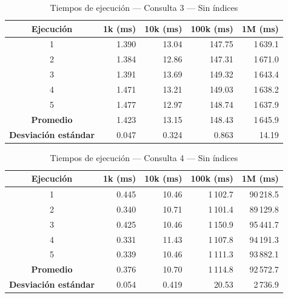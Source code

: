 \begin{table}[H]
\centering
\small
\caption{Tiempos de ejecución --- Consulta 3 --- Sin índices}
\begin{tabular}{|c|r|r|r|r|}
\hline
\textbf{Ejecución} & \textbf{1k (ms)} & \textbf{10k (ms)} & \textbf{100k (ms)} & \textbf{1M (ms)} \\ \hline
1 & 1.390 & 13.04 & 147.75 & 1\,639.1 \\ \hline
2 & 1.384 & 12.86 & 147.31 & 1\,671.0 \\ \hline
3 & 1.391 & 13.69 & 149.32 & 1\,643.4 \\ \hline
4 & 1.471 & 13.21 & 149.03 & 1\,638.2 \\ \hline
5 & 1.477 & 12.97 & 148.74 & 1\,637.9 \\ \hline
\textbf{Promedio} & 1.423 & 13.15 & 148.43 & 1\,645.9 \\ \hline
\textbf{Desviación estándar} & 0.047 & 0.324 & 0.863 & 14.19 \\ \hline
\end{tabular}

\end{table}

\begin{table}[H]
\centering
\small
\caption{Tiempos de ejecución --- Consulta 4 --- Sin índices}
\begin{tabular}{|c|r|r|r|r|}
\hline
\textbf{Ejecución} & \textbf{1k (ms)} & \textbf{10k (ms)} & \textbf{100k (ms)} & \textbf{1M (ms)} \\ \hline
1 & 0.445 & 10.46 & 1\,102.7 & 90\,218.5 \\ \hline
2 & 0.340 & 10.71 & 1\,101.4 & 89\,129.8 \\ \hline
3 & 0.425 & 10.46 & 1\,150.9 & 95\,441.7 \\ \hline
4 & 0.331 & 11.43 & 1\,107.8 & 94\,191.3 \\ \hline
5 & 0.339 & 10.46 & 1\,111.3 & 93\,882.1 \\ \hline
\textbf{Promedio} & 0.376 & 10.70 & 1\,114.8 & 92\,572.7 \\ \hline
\textbf{Desviación estándar} & 0.054 & 0.419 & 20.53 & 2\,736.9 \\ \hline
\end{tabular}

\end{table}

